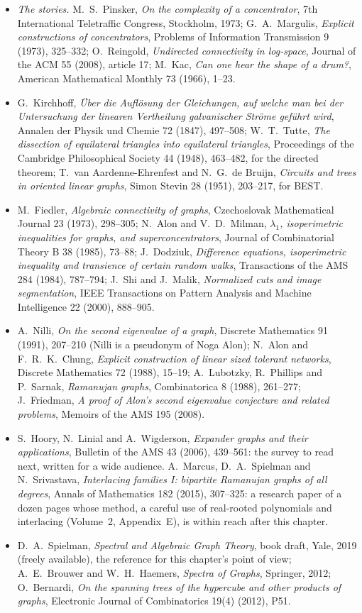 \begin{itemize}
\item \emph{The stories.} M.~S.~Pinsker, \emph{On the complexity of a concentrator}, 7th International Teletraffic Congress, Stockholm, 1973; G.~A.~Margulis, \emph{Explicit constructions of
concentrators}, Problems of Information Transmission 9 (1973), 325--332; O.~Reingold, \emph{Undirected connectivity in log-space}, Journal of the ACM 55 (2008), article 17; M.~Kac, \emph{Can one hear the shape of a drum?}, American Mathematical Monthly 73 (1966), 1--23.
\item G.~Kirchhoff, \emph{\"Uber die Aufl\"osung der Gleichungen, auf welche man bei der Untersuchung der linearen Vertheilung galvanischer Str\"ome gef\"uhrt wird}, Annalen der Physik
und Chemie 72 (1847), 497--508; W.~T.~Tutte, \emph{The dissection of equilateral triangles into equilateral triangles}, Proceedings of the Cambridge Philosophical Society 44 (1948),
463--482, for the directed theorem; T.~van Aardenne-Ehrenfest and N.~G.~de Bruijn, \emph{Circuits and trees in oriented linear graphs}, Simon Stevin 28 (1951), 203--217, for BEST.
\item M.~Fiedler, \emph{Algebraic connectivity of graphs}, Czechoslovak Mathematical Journal 23 (1973), 298--305; N.~Alon and V.~D.~Milman, \emph{$\lambda_1$, isoperimetric inequalities for graphs, and
superconcentrators}, Journal of Combinatorial Theory B 38 (1985), 73--88; J.~Dodziuk, \emph{Difference equations, isoperimetric inequality and transience of certain random walks}, Transactions
of the AMS 284 (1984), 787--794; J.~Shi and J.~Malik, \emph{Normalized cuts and image segmentation}, IEEE Transactions on Pattern Analysis and Machine Intelligence 22 (2000), 888--905.
\item A.~Nilli, \emph{On the second eigenvalue of a graph}, Discrete Mathematics 91 (1991), 207--210 (Nilli is a pseudonym of Noga Alon); N.~Alon and F.~R.~K.~Chung, \emph{Explicit construction
of linear sized tolerant networks}, Discrete Mathematics 72 (1988), 15--19; A.~Lubotzky, R.~Phillips and P.~Sarnak, \emph{Ramanujan graphs}, Combinatorica 8 (1988), 261--277; J.~Friedman,
\emph{A proof of Alon's second eigenvalue conjecture and related problems}, Memoirs of the AMS 195 (2008).
\item S.~Hoory, N.~Linial and A.~Wigderson, \emph{Expander graphs and their applications}, Bulletin of the AMS 43 (2006), 439--561: the survey to read next, written for a wide audience. A.~Marcus, D.~A.~Spielman
and N.~Srivastava, \emph{Interlacing families I: bipartite Ramanujan graphs of all degrees}, Annals of Mathematics 182 (2015), 307--325: a research paper of a dozen pages whose method, a careful use of
real-rooted polynomials and interlacing (Volume~2, Appendix~E), is within reach after this chapter.
\item D.~A.~Spielman, \emph{Spectral and Algebraic Graph Theory}, book draft, Yale, 2019 (freely available), the reference for this chapter's point of view; A.~E.~Brouwer and W.~H.~Haemers,
\emph{Spectra of Graphs}, Springer, 2012; O.~Bernardi, \emph{On the spanning trees of the hypercube and other products of graphs}, Electronic Journal of Combinatorics 19(4) (2012), P51.
\end{itemize}
